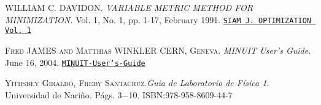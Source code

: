 \begin{thebibliography}{}
  \textsc{WILLIAM C. DAVIDON.}
 \textit{VARIABLE METRIC METHOD FOR MINIMIZATION.}
 \textup{Vol. 1, No. 1, pp. 1-17, February 1991.}
 \href{http://citeseerx.ist.psu.edu/viewdoc/download?doi=10.1.1.693.272&rep=rep1&type=pdf}{\texttt{SIAM J. OPTIMIZATION Vol. 1}} 
 
 
   \textsc{Fred JAMES
and
Matthias WINKLER
CERN, Geneva.}
 \textit{MINUIT User's Guide.}
 \textup{June 16, 2004.}
 \href{http://inspirehep.net/record/1258345/files/mnusersguide.pdf}{\texttt{MINUIT-User's-Guide}}
 
  \textsc{Yithsbey Giraldo, Fredy Santacruz.}\textit{Guia de Laboratorio de F\'isica 1.}
\textup{Universidad de Nari\~no. P\'ags. 3$-$10. ISBN:978-958-8609-44-7}
 
 
\end{thebibliography}
